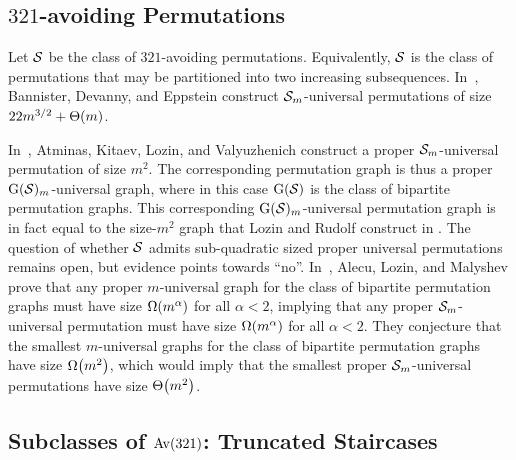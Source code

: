 \subsection{\texorpdfstring{$321$}{321}-avoiding Permutations}

Let $\S$ be the class of $321$-avoiding permutations. Equivalently, $\S$ is the class of permutations that may be partitioned into two increasing subsequences. In~\cite{bannister:small-superpatt:}, Bannister, Devanny, and Eppstein construct $\S_m$-universal permutations of size $22m^{3/2} + \oTheta{m}$.

In~\cite{Atminas:Universal-graph:}, Atminas, Kitaev, Lozin, and Valyuzhenich construct a proper $\S_m$-universal permutation of size $m^2$. The corresponding permutation graph is thus a proper $\g(\S)_m$-universal graph, where in this case $\g(\S)$ is the class of bipartite permutation graphs. This corresponding $\g(\S)_m$-universal permutation graph is in fact equal to the size-$m^2$ graph that Lozin and Rudolf construct in \cite{lozin:minimal-univers:}. The question of whether $\S$ admits sub-quadratic sized proper universal permutations remains open, but evidence points towards ``no''. In~\cite{alecu:critical-properties:}, Alecu, Lozin, and Malyshev prove that any proper $m$-universal graph for the class of bipartite permutation graphs must have size $\oOmega{m^\alpha}$ for all $\alpha < 2$, implying that any proper $\S_m$-universal permutation must have size $\oOmega{m^\alpha}$ for all $\alpha < 2$. They conjecture that the smallest $m$-universal graphs for the class of bipartite permutation graphs have size $\oOmega{m^2}$, which would imply that the smallest proper $\S_m$-universal permutations have size $\oTheta{m^2}$.

\subsection{Subclasses of \texorpdfstring{$\Av(321)$}{Av(321)}: Truncated Staircases}

